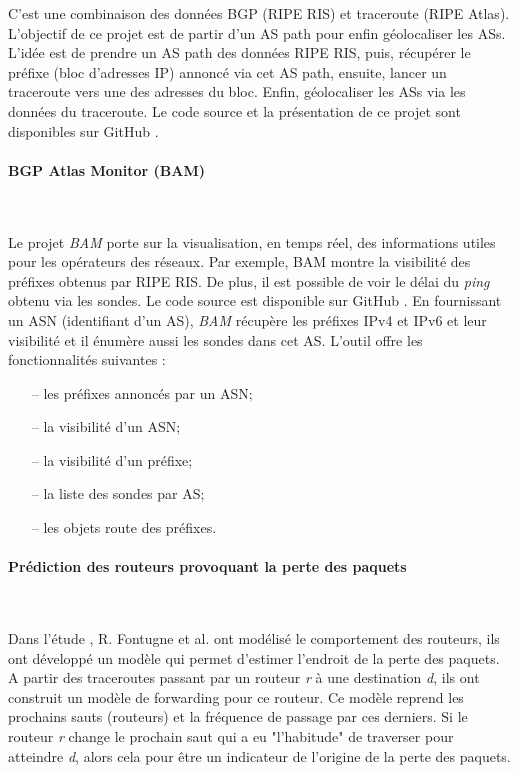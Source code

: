 C'est une combinaison des données BGP (RIPE RIS) et traceroute (RIPE Atlas). L'objectif de ce projet est de partir d'un AS path pour enfin géolocaliser les ASs. 
L'idée est de prendre un AS path des données RIPE RIS, puis, récupérer le préfixe (bloc d'adresses IP) annoncé via cet AS path, ensuite, lancer un traceroute vers une des adresses du bloc. Enfin, géolocaliser les ASs via les données du traceroute. 
Le code source et la présentation de ce projet sont disponibles sur GitHub \cite{bgp-traceroutes,pres-bgp-traceroute}. 


\paragraph{BGP Atlas Monitor (BAM)} ~

Le projet \textit{BAM} porte sur la visualisation, en temps réel,  des informations utiles pour les opérateurs des réseaux. Par exemple, BAM montre  la visibilité des préfixes obtenus par RIPE RIS. De plus,  il est possible de voir  le délai du \textit{ping} obtenu via les sondes. Le code source est disponible sur  GitHub \cite{bam}. En fournissant un ASN (identifiant d'un AS), \textit{BAM} récupère les préfixes IPv4 et IPv6 et leur visibilité et il énumère aussi les sondes dans cet AS. L'outil offre  les  fonctionnalités suivantes :
\begin{itemize}
	\item[--] les préfixes annoncés par un ASN;
	\item[--] la visibilité d'un ASN;
	\item[--] la visibilité d'un préfixe;
	\item[--] la liste des sondes par AS;
	\item[--] les objets  route des préfixes.
\end{itemize}

\paragraph{Prédiction des routeurs provoquant la perte des paquets }~

Dans l'étude \cite{DBLP:journals/corr/FontugneAPB16}, R. Fontugne et al. ont modélisé le comportement  des routeurs, ils ont développé un modèle qui permet d'estimer l'endroit de la  perte des paquets. A partir des traceroutes passant par un routeur \textit{r} à une destination \textit{d}, ils ont construit un modèle de forwarding pour ce routeur. Ce modèle reprend les prochains sauts (routeurs) et la fréquence de passage par ces derniers. Si le routeur \textit{r} change le prochain saut qui a eu "l'habitude" de traverser  pour atteindre \textit{d}, alors cela pour être un indicateur de l'origine  de la perte des paquets.

